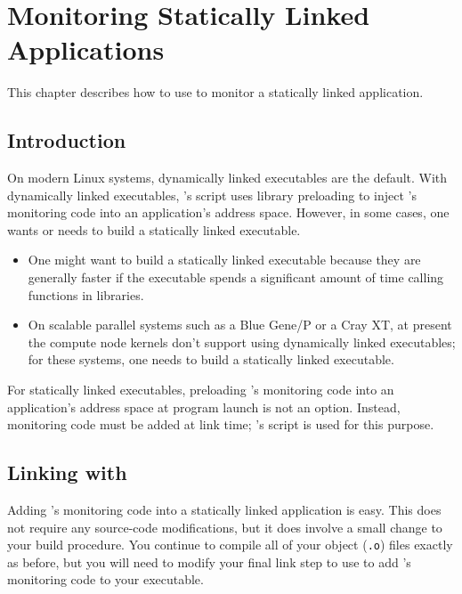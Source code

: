 \documentclass[11pt,letterpaper]{report}
\begin{document}
\chapter{Monitoring Statically Linked Applications}
\label{chpt:statically-linked-apps}

This chapter describes how to use \HPCToolkit{} to monitor a statically linked application.


\section{Introduction}

On modern Linux systems, dynamically linked executables are the default.
With dynamically linked executables, \HPCToolkit{}'s \hpcrun{} script uses library preloading to inject \HPCToolkit's monitoring code into an application's address space.
However, in some cases, one wants or needs to build a statically linked executable.
\begin{itemize}
\item One might want to build a statically linked executable because they are generally faster if the executable spends a significant amount of time calling functions in libraries.
\item On scalable parallel systems such as a Blue Gene/P or a Cray XT, at present the compute node kernels don't support using dynamically linked executables; for these systems, one needs to build a statically linked executable.
\end{itemize}

For statically linked executables, preloading \HPCToolkit's monitoring code into an application's address space at program launch is not an option.
Instead, monitoring code must be added at link time; \HPCToolkit{}'s \hpclink{} script is used for this purpose.


\section{Linking with \hpclink{}}

Adding \HPCToolkit{}'s monitoring code into a statically linked application is easy.
This does not require any source-code modifications, but it does involve a small change to your build procedure.
You continue to compile all of your object (\texttt{.o}) files exactly as before, but you will need to modify your final link step to use \hpclink{} to add \HPCToolkit{}'s monitoring code to your executable.
\end{document}
